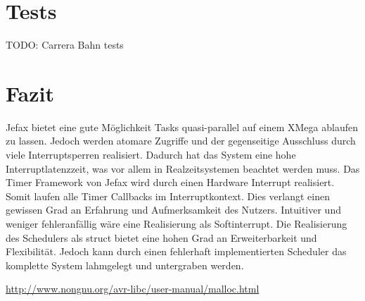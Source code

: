 \documentclass[fontsize=12pt, toc=bibliography, notitlepage]{scrreprt}
\begin{document}

\chapter{Tests}
\label{chap:tests}
TODO: Carrera Bahn tests

\chapter{Fazit}
\label{chap:fazit}

Jefax bietet eine gute Möglichkeit Tasks quasi-parallel auf einem XMega ablaufen zu lassen. Jedoch werden atomare Zugriffe und der gegenseitige Ausschluss durch viele Interruptsperren realisiert. Dadurch hat das System eine hohe Interruptlatenzzeit, was vor allem in Realzeitsystemen beachtet werden muss.
Das Timer Framework von Jefax wird durch einen Hardware Interrupt realisiert. Somit laufen alle Timer Callbacks im Interruptkontext. Dies verlangt einen gewissen Grad an Erfahrung und Aufmerksamkeit des Nutzers. Intuitiver und weniger fehleranfällig wäre eine Realisierung als Softinterrupt.
Die Realisierung des Schedulers als struct bietet eine hohen Grad an Erweiterbarkeit und Flexibilität. Jedoch kann durch einen fehlerhaft implementierten Scheduler das komplette System lahmgelegt und untergraben werden.

\begin{thebibliography}{999}
 \url{http://www.nongnu.org/avr-libc/user-manual/malloc.html}
\end{thebibliography}

\cleardoublepage
{}
\listoffigures
\end{document}
